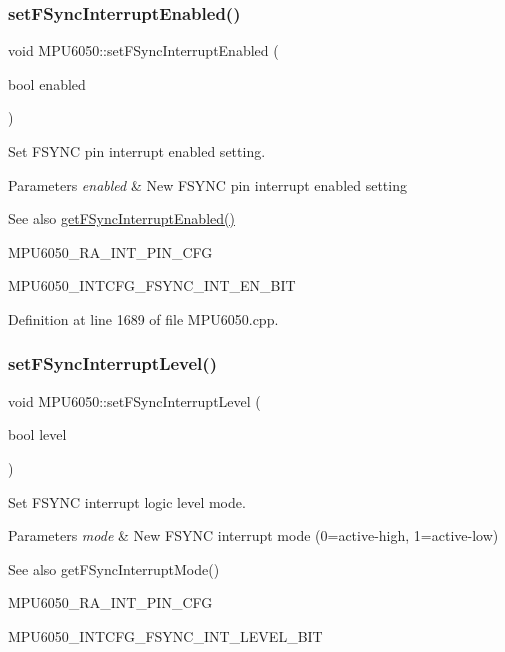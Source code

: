 \subsubsection{\texorpdfstring{setFSyncInterruptEnabled()}{setFSyncInterruptEnabled()}}
{\footnotesize\ttfamily void M\+P\+U6050\+::set\+F\+Sync\+Interrupt\+Enabled (\begin{DoxyParamCaption}\item[{bool}]{enabled }\end{DoxyParamCaption})}



Set F\+S\+Y\+NC pin interrupt enabled setting. 


\begin{DoxyParams}{Parameters}
{\em enabled} & New F\+S\+Y\+NC pin interrupt enabled setting \\
\hline
\end{DoxyParams}
\begin{DoxySeeAlso}{See also}
\mbox{\hyperlink{classMPU6050_a4c01f9ab83b64dbbc6b62e658c3d3d9b}{get\+F\+Sync\+Interrupt\+Enabled()}} 

M\+P\+U6050\+\_\+\+R\+A\+\_\+\+I\+N\+T\+\_\+\+P\+I\+N\+\_\+\+C\+FG 

M\+P\+U6050\+\_\+\+I\+N\+T\+C\+F\+G\+\_\+\+F\+S\+Y\+N\+C\+\_\+\+I\+N\+T\+\_\+\+E\+N\+\_\+\+B\+IT 
\end{DoxySeeAlso}


Definition at line 1689 of file M\+P\+U6050.\+cpp.

\mbox{\label{classMPU6050_a2b1c75cfc29e8ff8205f4ff33a426716}} 
\subsubsection{\texorpdfstring{setFSyncInterruptLevel()}{setFSyncInterruptLevel()}}
{\footnotesize\ttfamily void M\+P\+U6050\+::set\+F\+Sync\+Interrupt\+Level (\begin{DoxyParamCaption}\item[{bool}]{level }\end{DoxyParamCaption})}



Set F\+S\+Y\+NC interrupt logic level mode. 


\begin{DoxyParams}{Parameters}
{\em mode} & New F\+S\+Y\+NC interrupt mode (0=active-\/high, 1=active-\/low) \\
\hline
\end{DoxyParams}
\begin{DoxySeeAlso}{See also}
get\+F\+Sync\+Interrupt\+Mode() 

M\+P\+U6050\+\_\+\+R\+A\+\_\+\+I\+N\+T\+\_\+\+P\+I\+N\+\_\+\+C\+FG 

M\+P\+U6050\+\_\+\+I\+N\+T\+C\+F\+G\+\_\+\+F\+S\+Y\+N\+C\+\_\+\+I\+N\+T\+\_\+\+L\+E\+V\+E\+L\+\_\+\+B\+IT 
\end{DoxySeeAlso}


